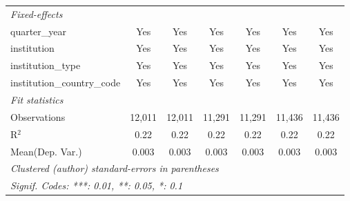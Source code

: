 \begin{tabular}{lcccccc}
   \midrule
   \emph{Fixed-effects}\\
   quarter\_year                      & Yes      & Yes        & Yes      & Yes       & Yes         & Yes\\  
   institution                        & Yes      & Yes        & Yes      & Yes       & Yes         & Yes\\  
   institution\_type                  & Yes      & Yes        & Yes      & Yes       & Yes         & Yes\\  
   institution\_country\_code         & Yes      & Yes        & Yes      & Yes       & Yes         & Yes\\  
   \midrule
   \emph{Fit statistics}\\
   Observations                       & 12,011   & 12,011     & 11,291   & 11,291    & 11,436      & 11,436\\  
   R$^2$                              & 0.22     & 0.22       & 0.22     & 0.22      & 0.22        & 0.22\\  
Mean(Dep. Var.) & 0.003 & 0.003 & 0.003 & 0.003 & 0.003 & 0.003 \\
   \midrule \midrule
   \multicolumn{7}{l}{\emph{Clustered (author) standard-errors in parentheses}}\\
   \multicolumn{7}{l}{\emph{Signif. Codes: ***: 0.01, **: 0.05, *: 0.1}}\\
\end{tabular}
\par\endgroup
